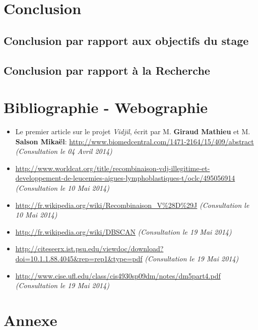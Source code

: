 \documentclass[12pt]{report}
\begin{document}
\begin{spacing}{1.2}
\chapter*{Conclusion}


\section*{Conclusion par rapport aux objectifs du stage}

\section*{Conclusion par rapport à la Recherche}

\chapter*{Bibliographie - Webographie}


\begin{itemize}
\item{Le premier article sur le projet \textit{Vidjil}, écrit par M. \textbf{Giraud Mathieu} et M. \textbf{Salson Mikaël}: \url{http://www.biomedcentral.com/1471-2164/15/409/abstract} \textit{(Consultation le 04 Avril 2014)}}
\item{\url{http://www.worldcat.org/title/recombinaison-vdj-illegitime-et-developpement-de-leucemies-aigues-lymphoblastiques-t/oclc/495056914} \textit{(Consultation le 10 Mai 2014)}}
\item{\url{http://fr.wikipedia.org/wiki/Recombinaison_V%28D%29J} \textit{(Consultation le 10 Mai 2014)}}
\item{\url{http://fr.wikipedia.org/wiki/DBSCAN} \textit{(Consultation le 19 Mai 2014)}}
\item{\url{http://citeseerx.ist.psu.edu/viewdoc/download?doi=10.1.1.88.4045&rep=rep1&type=pdf} \textit{(Consultation le 19 Mai 2014)}}
\item{\url{http://www.cise.ufl.edu/class/cis4930sp09dm/notes/dm5part4.pdf} \textit{(Consultation le 19 Mai 2014)}}
\end{itemize}

\chapter*{Annexe}


\end{spacing}
\end{document}
